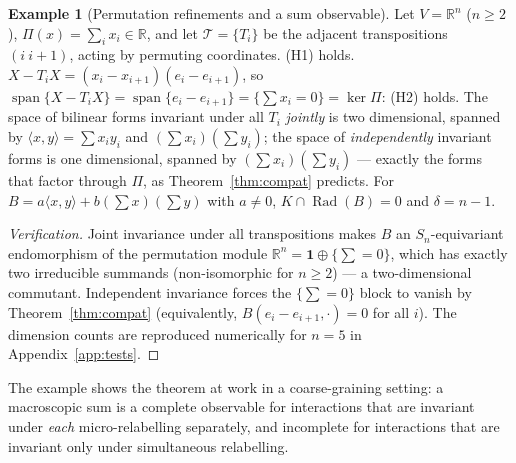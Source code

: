 \documentclass[11pt,a4paper]{article}
\newcommand{\RR}{\mathbb{R}}
\newcommand{\Rad}{\operatorname{Rad}}
\newcommand{\spn}{\operatorname{span}}
\newcommand{\defic}{\delta}
\theoremstyle{plain}
\theoremstyle{definition}
\newtheorem{example}[theorem]{Example}
\begin{document}
\begin{example}[Permutation refinements and a sum observable]\label{ex:perm}
Let $V=\RR^n$ ($n\ge2$), $\Pi(x)=\sum_ix_i\in\RR$, and let $\mathcal T=\{T_i\}$ be the adjacent transpositions $(i\ i{+}1)$, acting by permuting coordinates.
(H1) holds. $X-T_iX=(x_i-x_{i+1})(e_i-e_{i+1})$, so $\spn\{X-T_iX\}=\spn\{e_i-e_{i+1}\}=\{\sum x_i=0\}=\ker\Pi$: (H2) holds.
The space of bilinear forms invariant under all $T_i$ \emph{jointly} is two dimensional, spanned by $\langle x,y\rangle=\sum x_iy_i$ and $(\sum x_i)(\sum y_i)$; the space of \emph{independently} invariant forms is one dimensional, spanned by $(\sum x_i)(\sum y_i)$ --- exactly the forms that factor through $\Pi$, as Theorem~\ref{thm:compat} predicts. For $B=a\langle x,y\rangle+b(\sum x)(\sum y)$ with $a\ne0$, $K\cap\Rad(B)=0$ and $\defic=n-1$.
\end{example}
\begin{proof}[Verification]
Joint invariance under all transpositions makes $B$ an $S_n$-equivariant endomorphism of the permutation module $\RR^n=\mathbf 1\oplus\{\sum=0\}$, which has exactly two irreducible summands (non-isomorphic for $n\ge2$) --- a two-dimensional commutant. Independent invariance forces the $\{\sum=0\}$ block to vanish by Theorem~\ref{thm:compat} (equivalently, $B(e_i-e_{i+1},\cdot)=0$ for all $i$). The dimension counts are reproduced numerically for $n=5$ in Appendix~\ref{app:tests}.
\end{proof}
The example shows the theorem at work in a coarse-graining setting: a macroscopic sum is a complete observable for interactions that are invariant under \emph{each} micro-relabelling separately, and incomplete for interactions that are invariant only under simultaneous relabelling.
\end{document}
